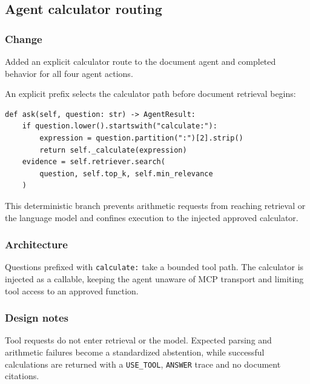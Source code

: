 
\subsection{Agent calculator routing}


\subsubsection{Change}

Added an explicit calculator route to the document agent and completed behavior for all four agent actions.

An explicit prefix selects the calculator path before document retrieval begins:

\begin{verbatim}
def ask(self, question: str) -> AgentResult:
    if question.lower().startswith("calculate:"):
        expression = question.partition(":")[2].strip()
        return self._calculate(expression)
    evidence = self.retriever.search(
        question, self.top_k, self.min_relevance
    )
\end{verbatim}

This deterministic branch prevents arithmetic requests from reaching retrieval or the language model and confines execution to the injected approved calculator.

\subsubsection{Architecture}

Questions prefixed with \texttt{calculate:} take a bounded tool path. The calculator is injected as a callable, keeping the agent unaware of MCP transport and limiting tool access to an approved function.

\subsubsection{Design notes}

Tool requests do not enter retrieval or the model. Expected parsing and arithmetic failures become a standardized abstention, while successful calculations are returned with a \texttt{USE\_TOOL}, \texttt{ANSWER} trace and no document citations.


